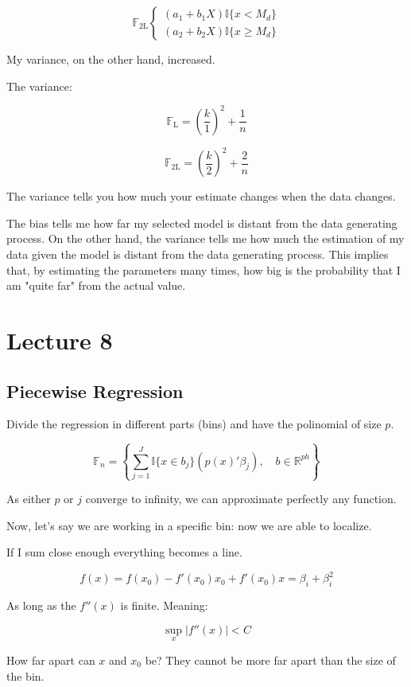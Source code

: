 \documentclass{article}
\begin{document}
$$
\mathbb{F}_{\text{2L}}
\begin{cases*}
    (a_1 + b_1 X) \mathbb{I} \{x < M_d\} \\
    (a_2 + b_2 X) \mathbb{I} \{x \geq M_d\}
\end{cases*}
$$

My variance, on the other hand, increased.

The variance:

$$
\mathbb{F}_{\text{L}} = \left( \frac{k}{1} \right)^2 + \frac{1}{n}
$$

$$
\mathbb{F}_{\text{2L}} = \left( \frac{k}{2} \right)^2 + \frac{2}{n}
$$

The variance tells you how much your estimate changes when the data changes.

The bias tells me how far my selected model is distant from the data generating process. On the other hand, the variance tells me how much the estimation of my data given the model is distant from the data generating process. This implies that, by estimating the parameters many times, how big is the probability that I am "quite far" from the actual value.

\section{Lecture 8}
\subsection{Piecewise Regression}

Divide the regression in different parts (bins) and have the polinomial of size $p$.

$$
\mathbb{F}_n = \left\{ \sum_{j=1}^{J} \mathbb{I} \{ x \in b_j \} (p(x)' \beta_j), \quad b \in \mathbb{R}^{ph} \right\}
$$

As either $p$ or $j$ converge to infinity, we can approximate perfectly any function.

Now, let's say we are working in a specific bin: now we are able to localize.

If I sum close enough everything becomes a line.

$$
f(x) = f(x_0) - f'(x_0) x_0 + f'(x_0) x = \beta_i + \beta_i^2
$$

As long as the $f''(x)$ is finite. Meaning:

$$
\sup_x | f''(x) | < C
$$

How far apart can $x$ and $x_0$ be? They cannot be more far apart than the size of the bin.
\end{document}

